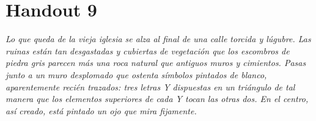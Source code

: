 \chapter{Handout 9}

\emph{Lo que queda de la vieja iglesia se alza al final de una calle torcida y
lúgubre. Las ruinas están tan desgastadas y cubiertas de vegetación que los
escombros de piedra gris parecen más una roca natural que antiguos muros y
cimientos. Pasas junto a un muro desplomado que ostenta símbolos pintados de
blanco, aparentemente recién trazados: tres letras Y dispuestas en un triángulo
de tal manera que los elementos superiores de cada Y tocan las otras dos. En
el centro, así creado, está pintado un ojo que mira fijamente.}

